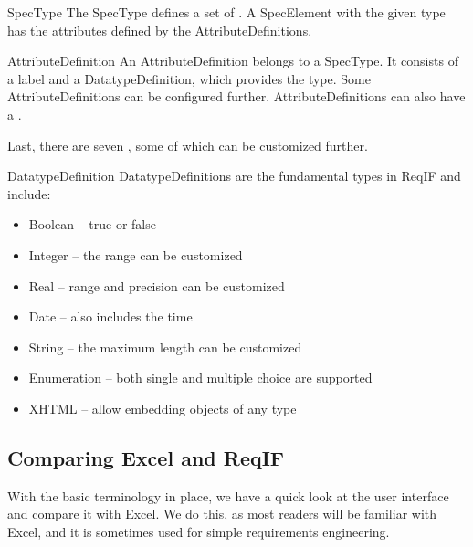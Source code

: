 \begin{definition}{SpecType}
The SpecType defines a set of .  A SpecElement with the given type has the attributes defined by the AttributeDefinitions.
\end{definition}

\begin{definition}{AttributeDefinition}
An AttributeDefinition belongs to a SpecType. It consists of a label and a DatatypeDefinition, which provides the type.  Some AttributeDefinitions can be configured further.  AttributeDefinitions can also have a .
\end{definition}

Last, there are seven , some of which can be customized further.

\begin{definition}{DatatypeDefinition}
DatatypeDefinitions are the fundamental types in ReqIF and include:
\begin{itemize}
\item Boolean -- true or false
\item Integer -- the range can be customized
\item Real -- range and precision can be customized
\item Date -- also includes the time
\item String -- the maximum length can be customized
\item Enumeration -- both single and multiple choice are supported
\item XHTML -- allow embedding objects of any type
\end{itemize}
\end{definition}

\subsection{Comparing Excel and ReqIF}

With the basic terminology in place, we have a quick look at the \pror{} user interface and compare it with Excel.  We do this, as most readers will be familiar with Excel, and it is sometimes used for simple requirements engineering. 

